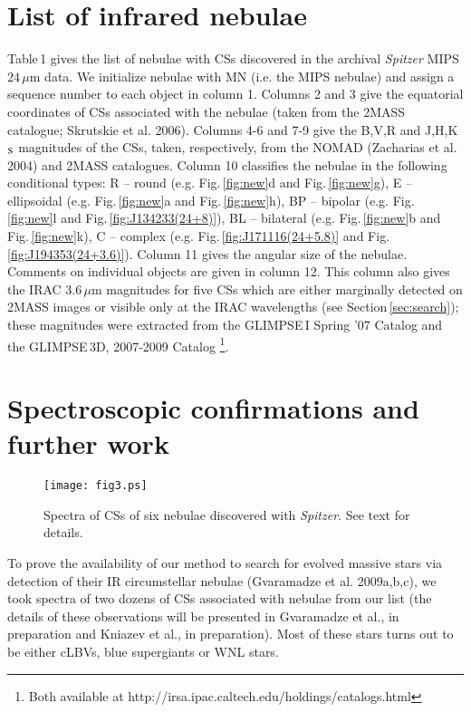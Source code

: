 \documentclass[useAMS]{mn2e}
\begin{document}
\section{List of infrared nebulae}
\label{sec:list}

Table\,1 gives the list of nebulae with CSs discovered in the
archival {\it Spitzer} MIPS $24\,\mu$m data. We initialize nebulae
with MN (i.e. the MIPS nebulae) and assign a sequence number to each
object in column 1. Columns 2 and 3 give the equatorial coordinates
of CSs associated with the nebulae (taken from the 2MASS catalogue;
Skrutskie et al. 2006). Columns 4-6 and 7-9 give the B,V,R and
J,H,K$_{\rm S}$ magnitudes of the CSs, taken, respectively, from the
NOMAD (Zacharias et al. 2004) and 2MASS catalogues. Column 10
classifies the nebulae in the following conditional types: R --
round (e.g. Fig.\,\ref{fig:new}d and Fig.\,\ref{fig:new}g), E --
ellipsoidal (e.g. Fig.\,\ref{fig:new}a and Fig.\,\ref{fig:new}h), BP
-- bipolar (e.g. Fig.\,\ref{fig:new}l and
Fig.\,\ref{fig:J134233(24+8)}), BL -- bilateral (e.g.
Fig.\,\ref{fig:new}b and Fig.\,\ref{fig:new}k), C -- complex (e.g.
Fig.\,\ref{fig:J171116(24+5.8)} and
Fig.\,\ref{fig:J194353(24+3.6)}). Column 11 gives the angular size
of the nebulae. Comments on individual objects are given in column
12. This column also gives the IRAC $3.6 \, \mu$m magnitudes for
five CSs which are either marginally detected on 2MASS images or
visible only at the IRAC wavelengths (see
Section\,\ref{sec:search}); these magnitudes were extracted from the
GLIMPSE\,I Spring '07 Catalog and the GLIMPSE\,3D, 2007-2009 Catalog
\footnote{Both available at
http://irsa.ipac.caltech.edu/holdings/catalogs.html}.

\section{Spectroscopic confirmations and further work}
\label{sec:spectr}

%
\begin{figure*}
\begin{center}
\texttt{[image: fig3.ps]}
\end{center}
\caption{Spectra of CSs of six nebulae discovered with {\it
Spitzer}. See text for details. } \label{fig:spectra}
\end{figure*}
%

To prove the availability of our method to search for evolved
massive stars via detection of their IR circumstellar nebulae
(Gvaramadze et al. 2009a,b,c), we took spectra of two dozens of CSs
associated with nebulae from our list (the details of these
observations will be presented in Gvaramadze et al., in preparation
and Kniazev et al., in preparation). Most of these stars turns out
to be either cLBVs, blue supergiants or WNL stars.
\end{document}

